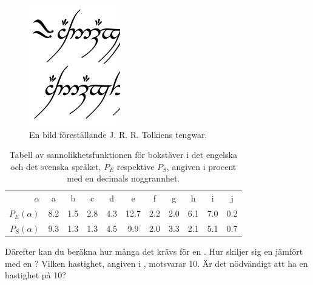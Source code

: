 \documentclass[a4paper]{article}
\begin{document}
	\begin{figure}
		\centering
		\includegraphics[width=0.2\linewidth]{tengwar.jpg}
		\caption{En bild föreställande J. R. R. Tolkiens tengwar.}
		\label{fig:bild}
	\end{figure}
	\begin{table}
		\centering
		\begin{tabular}{r|cccccccccc}
			\hline\hline
			\(\alpha\) & a & b & c & d & e & f & g & h & i & j \\
			\(P_E(\alpha)\) & 8.2  & 1.5 & 2.8 & 4.3 & 12.7 & 2.2 & 2.0 & 6.1 & 7.0 & 0.2 \\
			\(P_S(\alpha)\) & 9.3  & 1.3 & 1.3 & 4.5 & 9.9 & 2.0 & 3.3 & 2.1 & 5.1 & 0.7 \\
			\hline\hline
		\end{tabular}
		\caption{Tabell av sannolikhetsfunktionen för bokstäver i det engelska och det svenska språket, \(P_E\) respektive \(P_S\), angiven i procent med en decimals noggrannhet.}
		\label{tbl:SannolikhetstabellSpråk}
	\end{table}

	Därefter kan du beräkna hur många \mega\byte{} det krävs för en \giga\byte.
	Hur skiljer sig en \gibi\byte{} jämfört med en \giga\byte?
	Vilken hastighet, angiven i \giga\bit\per\second, motsvarar 
	\unit{10}{\gibi\bit\per\second}.
	Är det nödvändigt att ha en hastighet på \unit{10}{\tera\bit\per\second}?


	
\end{document}
